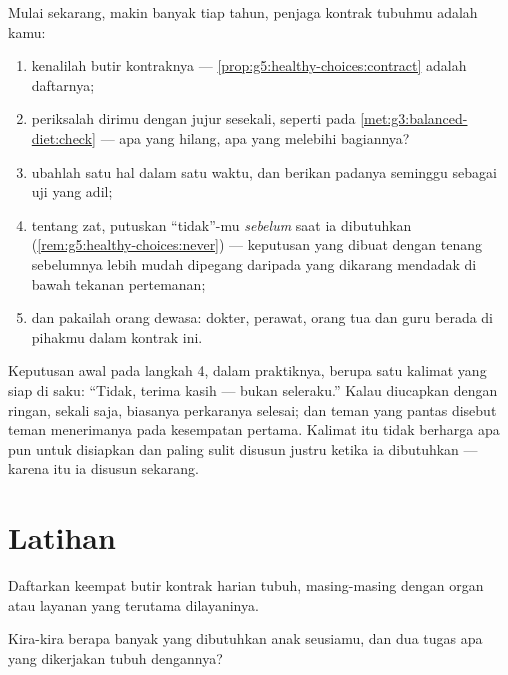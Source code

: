 \begin{method}\label{met:g5:healthy-choices:run}
Mulai sekarang, makin banyak tiap tahun, penjaga kontrak tubuhmu
adalah kamu:
\begin{enumerate}
  \item kenalilah butir kontraknya ---
        \cref{prop:g5:healthy-choices:contract} adalah daftarnya;
  \item periksalah dirimu dengan jujur sesekali, seperti pada
        \cref{met:g3:balanced-diet:check} --- apa yang hilang, apa
        yang melebihi bagiannya?
  \item ubahlah satu hal dalam satu waktu, dan berikan padanya
        seminggu sebagai uji yang adil;
  \item tentang zat, putuskan ``tidak''-mu \emph{sebelum} saat ia
        dibutuhkan
        (\cref{rem:g5:healthy-choices:never}) --- keputusan yang
        dibuat dengan tenang sebelumnya lebih mudah dipegang daripada
        yang dikarang mendadak di bawah tekanan pertemanan;
  \item dan pakailah orang dewasa: dokter, perawat, orang tua dan guru
        berada di pihakmu dalam kontrak ini.
\end{enumerate}
\end{method}

\begin{example}\label{ex:g5:healthy-choices:answers}
Keputusan awal pada langkah 4, dalam praktiknya, berupa satu kalimat
yang siap di saku: ``Tidak, terima kasih --- bukan seleraku.'' Kalau
diucapkan dengan ringan, sekali saja, biasanya perkaranya selesai; dan
teman yang pantas disebut teman menerimanya pada kesempatan pertama.
Kalimat itu tidak berharga apa pun untuk disiapkan dan paling sulit
disusun justru ketika ia dibutuhkan --- karena itu ia disusun
sekarang.
\end{example}

\section{Latihan}

\begin{exercise}[$\star$]\label{exo:g5:healthy-choices:1}
Daftarkan keempat butir kontrak harian tubuh, masing-masing dengan
organ atau layanan yang terutama dilayaninya.
\end{exercise}

\begin{exercise}[$\star$]\label{exo:g5:healthy-choices:2}
Kira-kira berapa banyak  yang dibutuhkan anak seusiamu, dan dua
tugas apa yang dikerjakan tubuh dengannya?
\end{exercise}

